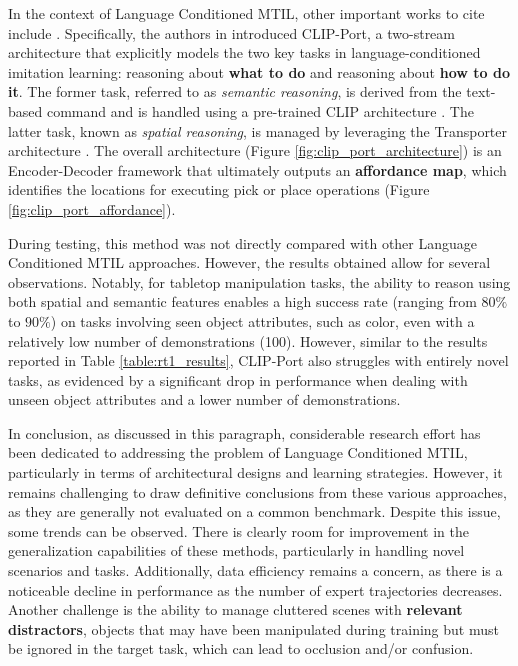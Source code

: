 In the context of Language Conditioned MTIL, other important works to cite include \cite{shridhar2022cliport, shridhar2023perceiver}. Specifically, the authors in \cite{shridhar2022cliport} introduced CLIP-Port, a two-stream architecture that explicitly models the two key tasks in language-conditioned imitation learning: reasoning about \textbf{what to do} and reasoning about \textbf{how to do it}. The former task, referred to as \textit{semantic reasoning}, is derived from the text-based command and is handled using a pre-trained CLIP architecture \cite{radford2021learning}. The latter task, known as \textit{spatial reasoning}, is managed by leveraging the Transporter architecture \cite{zeng2021transporter}. The overall architecture (Figure \ref{fig:clip_port_architecture}) is an Encoder-Decoder framework that ultimately outputs an \textbf{affordance map}, which identifies the locations for executing pick or place operations (Figure \ref{fig:clip_port_affordance}).

During testing, this method was not directly compared with other Language Conditioned MTIL approaches. However, the results obtained allow for several observations. Notably, for tabletop manipulation tasks, the ability to reason using both spatial and semantic features enables a high success rate (ranging from $80\%$ to $90\%$) on tasks involving seen object attributes, such as color, even with a relatively low number of demonstrations (100). However, similar to the results reported in Table \ref{table:rt1_results}, CLIP-Port also struggles with entirely novel tasks, as evidenced by a significant drop in performance when dealing with unseen object attributes and a lower number of demonstrations.



In conclusion, as discussed in this paragraph, considerable research effort has been dedicated to addressing the problem of Language Conditioned MTIL, particularly in terms of architectural designs and learning strategies. However, it remains challenging to draw definitive conclusions from these various approaches, as they are generally not evaluated on a common benchmark. Despite this issue, some trends can be observed. There is clearly room for improvement in the generalization capabilities of these methods, particularly in handling novel scenarios and tasks. Additionally, data efficiency remains a concern, as there is a noticeable decline in performance as the number of expert trajectories decreases. Another challenge is the ability to manage cluttered scenes with \textbf{relevant distractors}, objects that may have been manipulated during training but must be ignored in the target task, which can lead to occlusion and/or confusion.

